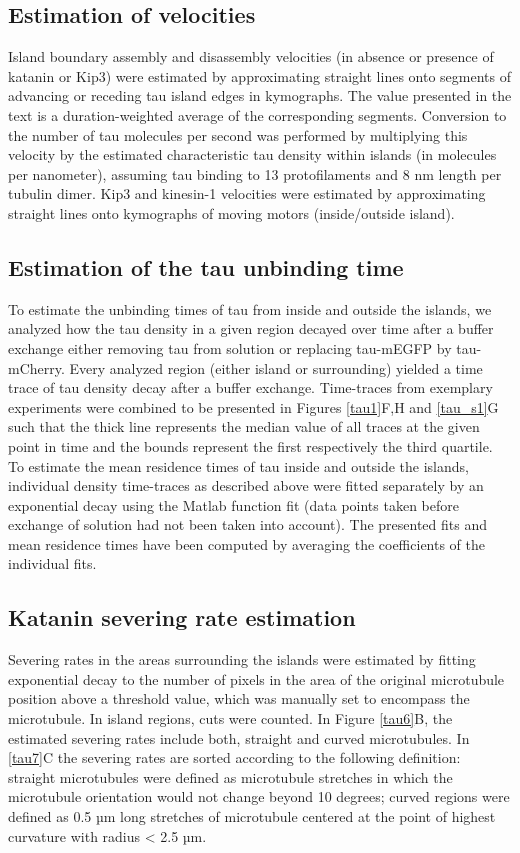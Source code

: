 \subsection{Estimation of velocities}
Island boundary assembly and disassembly velocities (in absence or presence of katanin or Kip3) were estimated by approximating straight lines onto segments of advancing or receding tau island edges in kymographs. The value presented in the text is a duration-weighted average of the corresponding segments. Conversion to the number of tau molecules per second was performed by multiplying this velocity by the estimated characteristic tau density within islands (in molecules per nanometer), assuming tau binding to 13 protofilaments and 8 nm length per tubulin dimer. Kip3 and kinesin-1 velocities were estimated by approximating straight lines onto kymographs of moving motors (inside/outside island). 

\subsection{Estimation of the tau unbinding time}
To estimate the unbinding times of tau from inside and outside the islands, we analyzed how the tau density in a given region decayed over time after a buffer exchange either removing tau from solution or replacing tau-mEGFP by tau-mCherry. Every analyzed region (either island or surrounding) yielded a time trace of tau density decay after a buffer exchange. Time-traces from exemplary experiments were combined to be presented in Figures \ref{tau1}F,H and \ref{tau_s1}G  such that the thick line represents the median value of all traces at the given point in time and the bounds represent the first respectively the third quartile. To estimate the mean residence times of tau inside and outside the islands, individual density time-traces as described above were fitted separately by an exponential decay using the Matlab function fit (data points taken before exchange of solution had not been taken into account). The presented fits and mean residence times have been computed by averaging the coefficients of the individual fits.

\subsection{Katanin severing rate estimation} 
Severing rates in the areas surrounding the islands were estimated by fitting exponential decay to the number of pixels in the area of the original microtubule position above a threshold value, which was manually set to encompass the microtubule. In island regions, cuts were counted. In Figure \ref{tau6}B, the estimated severing rates include both, straight and curved microtubules. In \ref{tau7}C the severing rates are sorted according to the following definition: straight microtubules were defined as microtubule stretches in which the microtubule orientation would not change beyond 10 degrees; curved regions were defined as 0.5 µm long stretches of microtubule centered at the point of highest curvature with radius < 2.5 µm.

